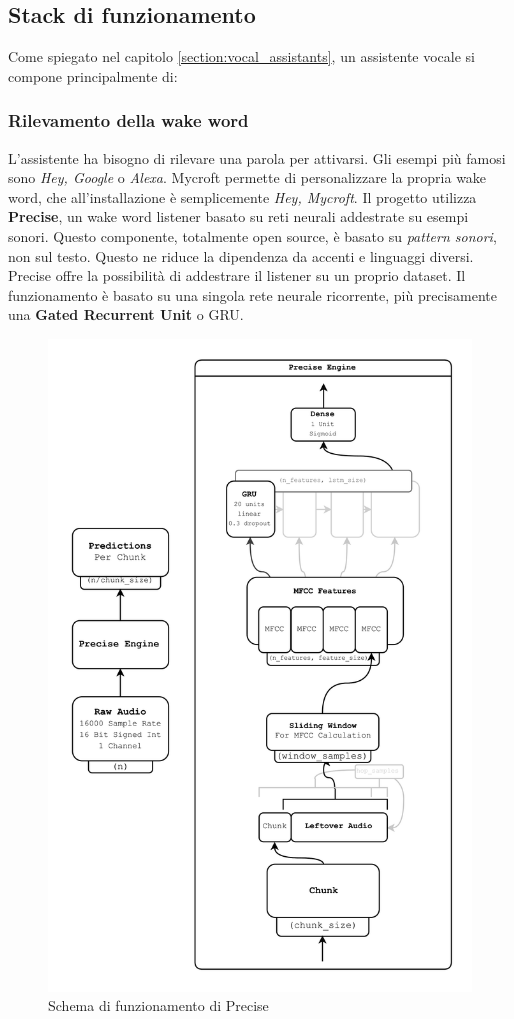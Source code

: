 \subsection{Stack di funzionamento}
Come spiegato nel capitolo \ref{section:vocal_assistants}, un assistente vocale si compone principalmente di:
\subsubsection{Rilevamento della wake word}
L'assistente ha bisogno di rilevare una parola per attivarsi. Gli esempi più famosi sono \textit{Hey, Google} o \textit{Alexa}. Mycroft permette di personalizzare la propria wake word, che all'installazione è semplicemente \textit{Hey, Mycroft}. Il progetto utilizza \textbf{Precise}, un wake word listener basato su reti neurali addestrate su esempi sonori. Questo componente, totalmente open source, è basato su \textit{pattern sonori}, non sul testo. Questo ne riduce la dipendenza da accenti e linguaggi diversi. Precise offre la possibilità di addestrare il listener su un proprio dataset. Il funzionamento è basato su una singola rete neurale ricorrente, più precisamente una \textbf{Gated Recurrent Unit} o GRU.
\begin{figure}[H]
    \begin{center}
        \includegraphics[width=0.6\columnwidth]{images/mycroft/precise.png}
    \end{center}
    \caption{Schema di funzionamento di Precise}
    \label{fig:precise}
\end{figure}
